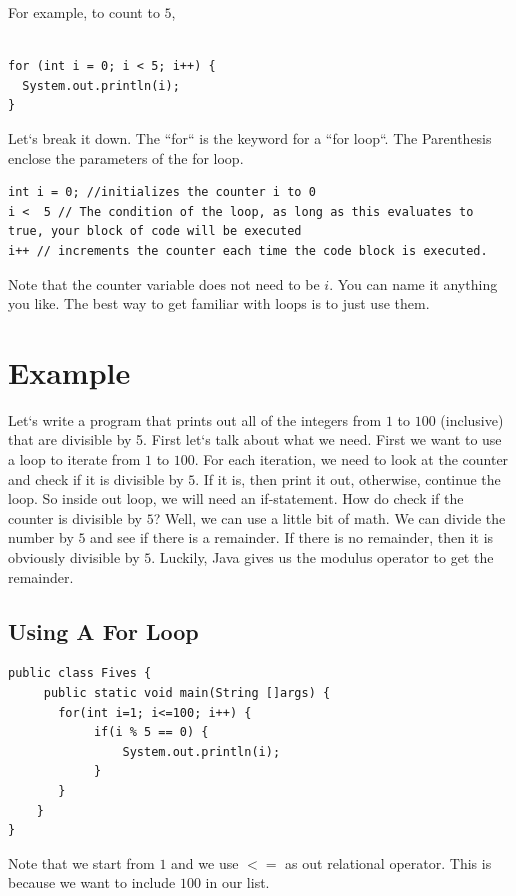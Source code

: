 \documentclass[11]{article}
\begin{document}
For example, to count to $5$, 

\begin{lstlisting}

for (int i = 0; i < 5; i++) {
  System.out.println(i);
}
\end{lstlisting}

Let`s break it down. The ``for`` is the keyword for a ``for loop``. The Parenthesis enclose the parameters of the for loop.
\begin{lstlisting}
int i = 0; //initializes the counter i to 0
i <  5 // The condition of the loop, as long as this evaluates to true, your block of code will be executed
i++ // increments the counter each time the code block is executed.
\end{lstlisting}

Note that the counter variable does not need to be $i$. You can name it anything you like. The best way to get familiar with loops is to just use them.

\section{Example}
Let`s write a program that prints out all of the integers from $1$ to $100$ (inclusive) that are divisible by 5. First let`s talk about what we need. First we want to use a loop to iterate from $1$ to $100$. For each iteration, we need to look at the counter and check if it is divisible by $5$. If it is, then print it out, otherwise, continue the loop. So inside out loop, we will need an if-statement. How do check if the counter is divisible by $5$? Well, we can use a little bit of math. We can divide the number by $5$ and see if there is a remainder. If there is no remainder, then it is obviously divisible by $5$. Luckily, Java gives us the modulus operator to get the remainder. 
\subsection{Using A For Loop}

\begin{lstlisting}
public class Fives {
     public static void main(String []args) {
       for(int i=1; i<=100; i++) {
            if(i % 5 == 0) {
                System.out.println(i);
            }
       }
    }
}
\end{lstlisting}

Note that we start from $1$ and we use $<=$ as out relational operator. This is because we want to include $100$ in our list.
\end{document}
